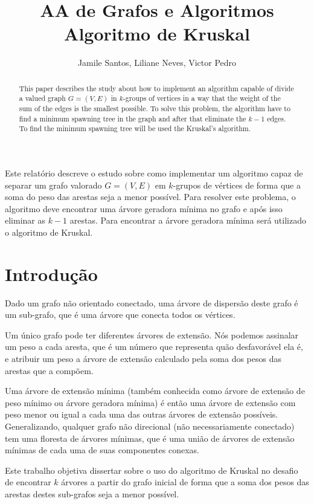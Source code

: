 \documentclass[12pt]{article}
\title{AA de Grafos e Algoritmos \\ Algoritmo de Kruskal}
\author{ Jamile Santos\inst{1}, Liliane Neves\inst{1}, Victor Pedro\inst{1} }
\begin{document}
	\maketitle
 \nocite{*} 
\begin{abstract}
	This paper describes the study about how to implement an algorithm capable of divide a valued graph $G=(V,E)$ in $k$-groups of vertices in a way that the weight of the sum of the edges is the smallest possible. To solve this problem, the algorithm have to find a minimum spawning tree in the graph and after that eliminate the $k-1$ edges. To find the minimum spawning tree will be used the Kruskal's algorithm.
\end{abstract}

\begin{resumo}
	Este relatório descreve o estudo sobre como implementar um algoritmo capaz de separar um grafo valorado $G=(V,E)$ em $k$-grupos de vértices de forma que a soma do peso das arestas seja a menor possível. Para resolver este problema, o algoritmo deve encontrar uma árvore geradora mínima no grafo e após isso eliminar as $k-1$ arestas. Para encontrar a árvore geradora mínima será utilizado o algoritmo de Kruskal.
\end{resumo}

\section{Introdução}
	Dado um grafo não orientado conectado, uma árvore de dispersão deste grafo é um sub-grafo, que é uma árvore que conecta todos os vértices. 
	
	Um único grafo pode ter diferentes árvores de extensão. Nós podemos assinalar um peso a cada aresta, que é um número que representa quão desfavorável ela é, e atribuir um peso a árvore de extensão calculado pela soma dos pesos das arestas que a compõem.
	
	Uma árvore de extensão mínima (também conhecida como árvore de extensão de peso mínimo ou árvore geradora mínima) é então uma árvore de extensão com peso menor ou igual a cada uma das outras árvores de extensão possíveis. Generalizando, qualquer grafo não direcional (não necessariamente conectado) tem uma floresta de árvores mínimas, que é uma união de árvores de extensão mínimas de cada uma de suas componentes conexas.
	
	Este trabalho objetiva dissertar sobre o uso do algoritmo de Kruskal no desafio de encontrar $k$ árvores a partir do grafo inicial de forma que a soma dos pesos das arestas destes sub-grafos seja a menor possível.
	
\end{document}
